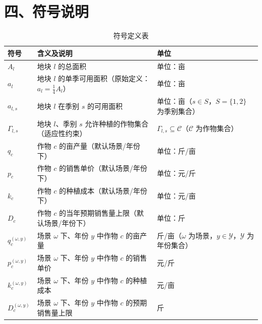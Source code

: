 \documentclass[12pt]{article}
\begin{document}
\section{四、符号说明}
\begin{table}[htbp]
    \centering
    \begin{tabular}{l p{6.5cm} l} %
        \toprule
        \textbf{符号} & \textbf{含义及说明} & \textbf{单位} \\
        \midrule
        $A_l$          & 地块 $l$ 的总面积               & 单位：亩 \\
        $a_l$          & 地块 $l$ 的单季可用面积（原始定义：$a_l = \frac{1}{4}A_l$） & 单位：亩 \\
        $a_{l,s}$      & 地块 $l$ 在季别 $s$ 的可用面积   & 单位：亩（$s \in S$，$S = \{1,2\}$ 为季别集合） \\
        $\Gamma_{l,s}$ & 地块 $l$、季别 $s$ 允许种植的作物集合（适应性约束） & $\Gamma_{l,s} \subseteq \mathcal{C}$（$\mathcal{C}$ 为作物集合） \\
        
        $q_c$          & 作物 $c$ 的亩产量（默认场景/年份下） & 单位：斤/亩 \\
        $p_c$          & 作物 $c$ 的销售单价（默认场景/年份下） & 单位：元/斤 \\
        $k_c$          & 作物 $c$ 的种植成本（默认场景/年份下） & 单位：元/亩 \\
        $D_c$          & 作物 $c$ 的当年预期销售量上限（默认场景/年份下） & 单位：斤 \\
        
        $q_c^{(\omega, y)}$ & 场景 $\omega$ 下、年份 $y$ 中作物 $c$ 的亩产量 & 斤/亩（$\omega$ 为场景，$y \in \mathcal{Y}$，$\mathcal{Y} $ 为年份集合） \\
        $p_c^{(\omega, y)}$ & 场景 $\omega$ 下、年份 $y$ 中作物 $c$ 的销售单价 & 元/斤 \\
        $k_c^{(\omega, y)}$ & 场景 $\omega$ 下、年份 $y$ 中作物 $c$ 的种植成本 & 元/亩 \\
        $D_c^{(\omega, y)}$ & 场景 $\omega$ 下、年份 $y$ 中作物 $c$ 的预期销售量上限 & 斤 \\
        \bottomrule
    \end{tabular}
    \caption{符号定义表}
    \label{tab:symbols_merged}
\end{table}
\end{document}
